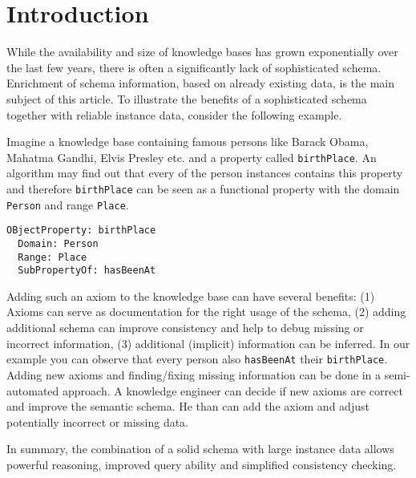 \section{Introduction}
While the availability and size of knowledge bases has grown exponentially over
the last few years, there is often a significantly lack of sophisticated
schema.
Enrichment of schema information, based on already existing data, is the main
subject of this article.
To illustrate the benefits of a sophisticated schema together with reliable
instance data, consider the following example.

\begin{example}
Imagine a knowledge base containing famous persons like Barack Obama, Mahatma
Gandhi, Elvis Presley etc. and a property called \texttt{birthPlace}. An
algorithm may find out that every of the person instances contains this property
and therefore \texttt{birthPlace} can be seen as a functional property with the
domain \texttt{Person} and range \texttt{Place}.
\vspace{-0.90 cm}
\begin{verbatim}
OBjectProperty: birthPlace
  Domain: Person
  Range: Place
  SubPropertyOf: hasBeenAt
\end{verbatim}
\end{example}
\vspace{-0.4 cm}

Adding such an axiom to the knowledge base can have several benefits:
(1) Axioms can serve as documentation for the right usage of the
schema, (2) adding additional schema can improve consistency and help to debug missing or incorrect
information, (3) additional (implicit) information can be inferred. In our
example you can observe that every person also \texttt{hasBeenAt} their
\texttt{birthPlace}.
Adding new axioms and finding/fixing missing information can be done in a
semi-automated approach. A knowledge engineer can decide if new axioms are
correct and improve the semantic schema. He than can add the axiom and adjust
potentially incorrect or missing data. \cite{paper2}

In summary, the combination of a solid schema with large instance data allows
powerful reasoning, improved query ability and simplified consistency checking. 